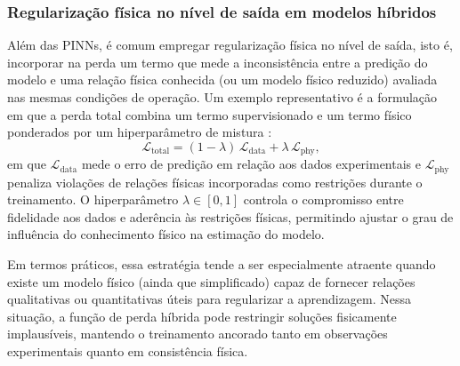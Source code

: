 \subsubsection{Regularização física no nível de saída em modelos híbridos}
\label{subsec:regularizacao_saida}

Além das PINNs, é comum empregar regularização física no nível de saída, isto é, incorporar na perda um termo que mede a inconsistência entre a predição do modelo e uma relação física conhecida (ou um modelo físico reduzido) avaliada nas mesmas condições de operação. Um exemplo representativo é a formulação em que a perda total combina um termo supervisionado e um termo físico ponderados por um hiperparâmetro de mistura \cite{zhou2025physics}:
\begin{equation}
\label{eq:loss_hibrida_ponderada}
\mathcal{L}_{\mathrm{total}}
=
(1-\lambda)\,\mathcal{L}_{\mathrm{data}}
+
\lambda\,\mathcal{L}_{\mathrm{phy}},
\end{equation}
em que $\mathcal{L}_{\mathrm{data}}$ mede o erro de predição em relação aos dados experimentais e $\mathcal{L}_{\mathrm{phy}}$ penaliza violações de relações físicas incorporadas como restrições durante o treinamento. O hiperparâmetro $\lambda \in [0,1]$ controla o compromisso entre fidelidade aos dados e aderência às restrições físicas, permitindo ajustar o grau de influência do conhecimento físico na estimação do modelo.

Em termos práticos, essa estratégia tende a ser especialmente atraente quando existe um modelo físico (ainda que simplificado) capaz de fornecer relações qualitativas ou quantitativas úteis para regularizar a aprendizagem. Nessa situação, a função de perda híbrida pode restringir soluções fisicamente implausíveis, mantendo o treinamento ancorado tanto em observações experimentais quanto em consistência física.



